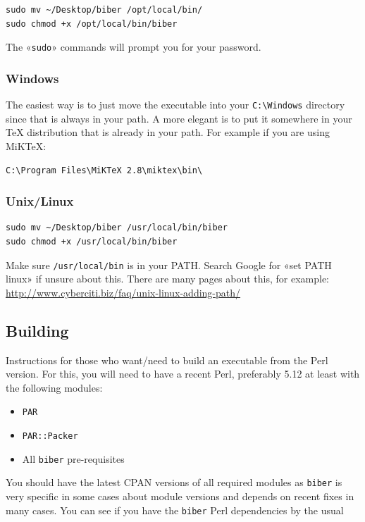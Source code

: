 \documentclass{ltxdockit}
\begin{document}
\begin{verbatim}
sudo mv ~/Desktop/biber /opt/local/bin/
sudo chmod +x /opt/local/bin/biber
\end{verbatim}

\noindent The «\verb+sudo+» commands will prompt you for your password.

\subsubsection{Windows}

The easiest way is to just move the executable into your \verb+C:\Windows+ directory since
that is always in your path. A more elegant is to put it somewhere in
your TeX distribution that is already in your path. For example if you
are using MiKTeX:

\begin{verbatim}
C:\Program Files\MiKTeX 2.8\miktex\bin\
\end{verbatim}

\subsubsection{Unix/Linux}

\begin{verbatim}
sudo mv ~/Desktop/biber /usr/local/bin/biber
sudo chmod +x /usr/local/bin/biber
\end{verbatim}

\noindent Make sure \verb+/usr/local/bin+ is in your PATH. Search Google for «set PATH
linux» if unsure about this. There are many pages about this, for example:
\url{http://www.cyberciti.biz/faq/unix-linux-adding-path/}


\subsection{Building}

Instructions for those who want/need to build an executable from the
Perl version. For this, you will need to have a recent Perl,
preferably 5.12 at least with the following modules:

\begin{itemize}
\item \verb+PAR+
\item \verb+PAR::Packer+
\item All \verb+biber+ pre-requisites
\end{itemize}

\noindent You should have the latest CPAN versions of all required modules
as \verb+biber+ is very specific in some cases about module versions and
depends on recent fixes in many cases. You can see if you have the
\verb+biber+ Perl dependencies by the usual
\end{document}
